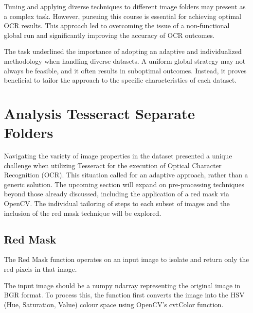 Tuning and applying diverse techniques to different image folders may present as a complex task. However, pursuing this course is essential for achieving optimal OCR results. This approach led to overcoming the issue of a non-functional global run and significantly improving the accuracy of OCR outcomes.

The task underlined the importance of adopting an adaptive and individualized methodology when handling diverse datasets. A uniform global strategy may not always be feasible, and it often results in suboptimal outcomes. Instead, it proves beneficial to tailor the approach to the specific characteristics of each dataset.

\newpage

\section{Analysis Tesseract Separate Folders}

Navigating the variety of image properties in the dataset presented a unique challenge when utilizing Tesseract for the execution of Optical Character Recognition (OCR). This situation called for an adaptive approach, rather than a generic solution. The upcoming section will expand on pre-processing techniques beyond those already discussed, including the application of a red mask via OpenCV. The individual tailoring of steps to each subset of images and the inclusion of the red mask technique will be explored.

\subsection{Red Mask}

The Red Mask function operates on an input image to isolate and return only the red pixels in that image.

The input image should be a numpy ndarray representing the original image in BGR format. To process this, the function first converts the image into the HSV (Hue, Saturation, Value) colour space using OpenCV's cvtColor function.


